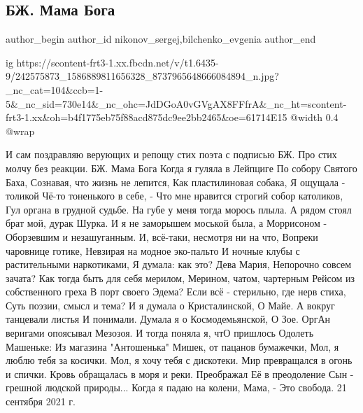  
 
 
 
 
 
\subsection{БЖ. Мама Бога}
\label{sec:21_09_2021.fb.nikonov_sergej.9.bilchenko_mama_boga}
 
\ifcmt
 author_begin
   author_id nikonov_sergej,bilchenko_evgenia
 author_end
\fi

\ifcmt
  ig https://scontent-frt3-1.xx.fbcdn.net/v/t1.6435-9/242575873_1586889811656328_8737965648666084894_n.jpg?_nc_cat=104&ccb=1-5&_nc_sid=730e14&_nc_ohc=JdDGoA0vGVgAX8FFfrA&_nc_ht=scontent-frt3-1.xx&oh=b4f1775eb75f88acd875dc9ee2bb2465&oe=61714E15
  @width 0.4
  @wrap 
\fi

И сам поздравляю верующих и репощу стих поэта с подписью БЖ. Про стих молчу без реакции. 
БЖ. Мама Бога
Когда я гуляла в Лейпциге
По собору Святого Баха,
Сознавая, что жизнь не лепится,
Как пластилиновая собака,
Я ощущала - толикой
Чё-то тоненького в себе, -
Что мне нравится
строгий собор католиков,
Гул органа в грудной судьбе.
На губе у меня тогда морось плыла.
А рядом стоял брат мой, дурак Шурка.
И я не заморышем моськой была,
а Моррисоном -
Оборзевшим и незашуганным.
И, всё-таки, несмотря ни на что,
Вопреки чаровнице готике,
Невзирая на модное эко-пальто
И ночные клубы
с растительными наркотиками,
Я думала: как это? Дева Мария,
Непорочно совсем зачата?
Как тогда быть для себя мерилом,
Мерином, чатом, чартерным
Рейсом из собственного греха
В порт своего Эдема?
Если всё - стерильно,
где нерв стиха,
Суть поэзии, смысл и тема?
И я думала о Кристалинской,
О Майе.
А вокруг танцевали листья
И понимали.
Думала я о Космодемьянской,
О Зое.
ОргАн веригами опоясывал
Мезозоя.
И тогда поняла я, чтО пришлось
Одолеть Машеньке:
Из магазина "Антошенька"
Мишек, от пацанов бумажечки,
Мол, я люблю тебя за косички.
Мол, я хочу тебя с дискотеки.
Мир превращался в огонь и спички.
Кровь обращалась в моря и реки.
Преображал Её в преодоление
Сын - грешной людской природы...
Когда я падаю на колени,
Мама, -
Это свобода.
21 сентября 2021 г.
